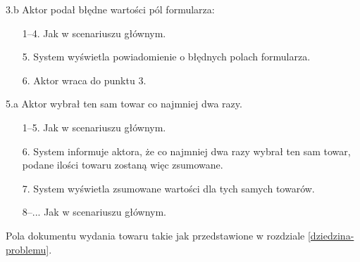 \begin{usecase}
{    \item [3.b] Aktor podał błędne wartości pól formularza:
      \begin{enumerate}
        \item[1--4.] Jak w scenariuszu głównym.
        \item[5.] System wyświetla powiadomienie o błędnych polach formularza.
        \item[6.] Aktor wraca do punktu 3.
      \end{enumerate}
     \item[5.a] Aktor wybrał ten sam towar co najmniej dwa razy.
       \begin{enumerate}
       \item[1--5.] Jak w scenariuszu głównym.
       \item[6.] System informuje aktora, że co najmniej dwa razy wybrał ten sam towar, podane ilości towaru zostaną więc zsumowane.
       \item[7.] System wyświetla zsumowane wartości dla tych samych towarów.
       \item[8--...] Jak w scenariuszu głównym.
       \end{enumerate}
  }
   {
    Pola dokumentu wydania towaru takie jak przedstawione w rozdziale \ref{dziedzina-problemu}.
  }
\end{usecase}

